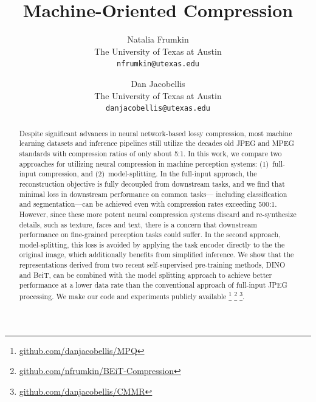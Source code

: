 \documentclass[10pt,twocolumn,letterpaper]{article}
\begin{document}
\title{Machine-Oriented Compression}

\author{Natalia Frumkin\\
The University of Texas at Austin\\
{\tt\small nfrumkin@utexas.edu}
\and
Dan Jacobellis\\
The University of Texas at Austin\\
{\tt\small danjacobellis@utexas.edu}
}

\maketitle


\begin{abstract}
Despite significant advances in neural network-based lossy compression, most machine learning datasets and inference pipelines still utilize the decades old JPEG and MPEG standards with compression ratios of only about 5:1.  In this work, we compare two approaches for utilizing neural compression in machine perception systems: (1)~full-input compression, and (2)~model-splitting. In the full-input approach, the reconstruction objective is fully decoupled from downstream tasks, and we find that minimal loss in downstream performance on common tasks--- including classification and segmentation---can be achieved even with compression rates exceeding 500:1. However, since these more potent neural compression systems discard and re-synthesize details, such as texture, faces and text, there is a concern that downstream performance on fine-grained perception tasks could suffer. In the second approach, model-splitting, this loss is avoided by applying the task encoder directly to the the original image, which additionally benefits from simplified inference. We show that the representations derived from two recent self-supervised pre-training methods, DINO and BeiT, can be combined with the model splitting approach to achieve better performance at a lower data rate than the conventional approach of full-input JPEG processing. We make our code and experiments publicly available
\footnote{\href{https://github.com/danjacobellis/MPQ}{github.com/danjacobellis/MPQ}}
\footnote{\href{https://github.com/nfrumkin/BEiT-compression}{github.com/nfrumkin/BEiT-Compression}}
\footnote{\href{https://github.com/danjacobellis/CMMR}{github.com/danjacobellis/CMMR}}.

\end{abstract}
\end{document}
